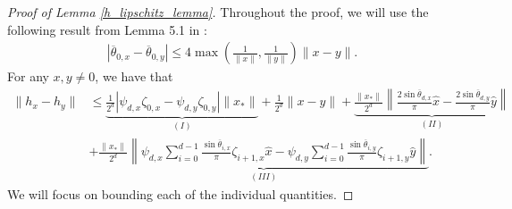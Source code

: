 \documentclass[11pt]{article}
\theoremstyle{remark}
\begin{document}
\begin{proof}[Proof of Lemma \ref{h_lipschitz_lemma}] Throughout the proof, we will use the following result from Lemma 5.1 in \cite{Huangetal2018}: \begin{align}
    |\overline{\theta}_{0,x} - \overline{\theta}_{0,y}| \leqslant 4 \max\left(\frac{1}{\|x\|},\frac{1}{\|y\|}\right)\|x - y \| \label{theta_0xy_bound}.
\end{align}
For any $x,y \neq 0$, we have that \begin{align*}
\|h_x - h_y\| & \leqslant \underbrace{\frac{1}{2^d}|\psi_{d,x}\zeta_{0,x} - \psi_{d,y}\zeta_{0,y}|\|x_*\|}_{(I)} + \frac{1}{2^d}\|x-y\| + \underbrace{\frac{\|x_*\|}{2^d}\left\|\frac{2\sin \overline{\theta}_{d,x}}{\pi}\hat{x} -  \frac{2\sin \overline{\theta}_{d,y}}{\pi}\hat{y}\right\|}_{(II)} \\
& + \underbrace{\frac{\|x_*\|}{2^d}\left\|\psi_{d,x}\sum_{i=0}^{d-1}\frac{\sin \overline{\theta}_{i,x}}{\pi}\zeta_{i+1,x}\hat{x} - \psi_{d,y}\sum_{i=0}^{d-1}\frac{\sin \overline{\theta}_{i,y}}{\pi}\zeta_{i+1,y}\hat{y}\right\|}_{(III)}.
\end{align*} We will focus on bounding each of the individual quantities.


\end{proof}
\end{document}

